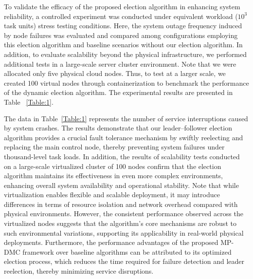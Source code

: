 \documentclass[twoside,twocolumn]{article}
\begin{document}
To validate the efficacy of the proposed election algorithm in enhancing system reliability, a controlled experiment was conducted under equivalent workload ($10^3$ task units) stress testing conditions. Here, the system outage frequency induced by node failures was evaluated and compared among configurations employing this election algorithm and baseline scenarios without our election algorithm. In addition, to evaluate scalability beyond the physical infrastructure, we performed additional tests in a large-scale server cluster environment. Note that we were allocated only five physical cloud nodes. Thus, to test at a larger scale, we created 100 virtual nodes through containerization to benchmark the performance of the dynamic election algorithm. The experimental results are presented in Table ~\ref{Table:1}.

The data in Table~\ref{Table:1} represents the number of service interruptions caused by system crashes. The results demonstrate that our leader--follower election algorithm provides a crucial fault tolerance mechanism by swiftly reelecting and replacing the main control node, thereby preventing system failures under thousand-level task loads. In addition, the results of scalability tests conducted on a large-scale virtualized cluster of 100 nodes confirm that the election algorithm maintains its effectiveness in even more complex environments, enhancing overall system availability and operational stability. Note that while virtualization enables flexible and scalable deployment, it may introduce differences in terms of resource isolation and network overhead compared with physical environments. However, the consistent performance observed across the virtualized nodes suggests that the algorithm's core mechanisms are robust to such environmental variations, supporting its applicability in real-world physical deployments. Furthermore, the performance advantages of the proposed MP-DMC framework over baseline algorithms can be attributed to its optimized election process, which reduces the time required for failure detection and leader reelection, thereby minimizing service disruptions.
\end{document}
